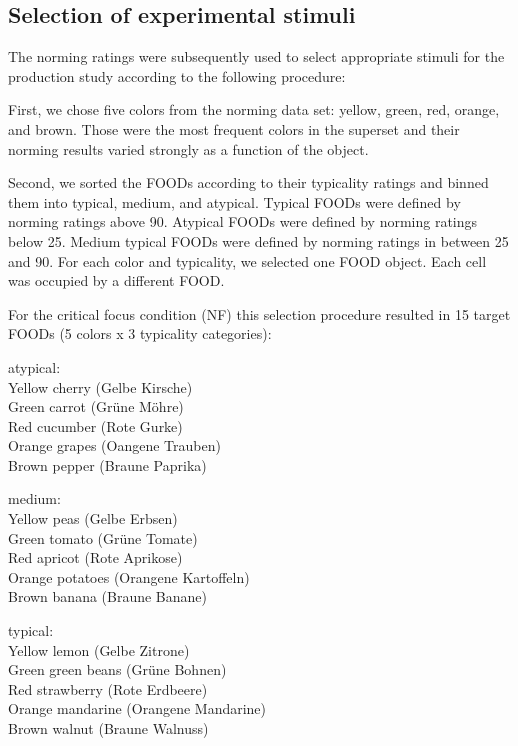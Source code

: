 \documentclass[
]{article}
\begin{document}
\hypertarget{selection-of-experimental-stimuli}{%
\subsection{Selection of experimental
stimuli}\label{selection-of-experimental-stimuli}}

The norming ratings were subsequently used to select appropriate stimuli
for the production study according to the following procedure:

First, we chose five colors from the norming data set: yellow, green,
red, orange, and brown. Those were the most frequent colors in the
superset and their norming results varied strongly as a function of the
object.

Second, we sorted the FOODs according to their typicality ratings and
binned them into typical, medium, and atypical. Typical FOODs were
defined by norming ratings above 90. Atypical FOODs were defined by
norming ratings below 25. Medium typical FOODs were defined by norming
ratings in between 25 and 90. For each color and typicality, we selected
one FOOD object. Each cell was occupied by a different FOOD.

For the critical focus condition (NF) this selection procedure resulted
in 15 target FOODs (5 colors x 3 typicality categories):

\noindent atypical:\\
\noindent Yellow cherry (Gelbe Kirsche)\\
\noindent Green carrot (Grüne Möhre)\\
\noindent Red cucumber (Rote Gurke)\\
\noindent Orange grapes (Oangene Trauben)\\
\noindent Brown pepper (Braune Paprika)

\noindent medium:\\
\noindent Yellow peas (Gelbe Erbsen)\\
\noindent Green tomato (Grüne Tomate)\\
\noindent Red apricot (Rote Aprikose)\\
\noindent Orange potatoes (Orangene Kartoffeln)\\
\noindent Brown banana (Braune Banane)

\noindent typical:\\
\noindent Yellow lemon (Gelbe Zitrone)\\
\noindent Green green beans (Grüne Bohnen)\\
\noindent Red strawberry (Rote Erdbeere)\\
\noindent Orange mandarine (Orangene Mandarine)\\
\noindent Brown walnut (Braune Walnuss)
\end{document}
